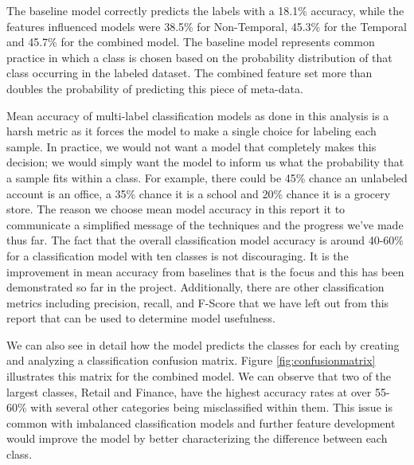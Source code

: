 The baseline model correctly predicts the labels with a 18.1\% accuracy, while the features influenced models were 38.5\% for Non-Temporal, 45.3\% for the Temporal and 45.7\% for the combined model.  The baseline model represents common practice in which a class is chosen based on the probability distribution of that class occurring in the labeled dataset. The combined feature set more than doubles the probability of predicting this piece of meta-data.

Mean accuracy of multi-label classification models as done in this analysis is a harsh metric as it forces the model to make a single choice for labeling each sample. In practice, we would not want a model that completely makes this decision; we would simply want the model to inform us what the probability that a sample fits within a class. For example, there could be 45\% chance an unlabeled account is an office, a 35\% chance it is a school and 20\% chance it is a grocery store. The reason we choose mean model accuracy in this report it to communicate a simplified message of the techniques and the progress we’ve made thus far. The fact that the overall classification model accuracy is around 40-60\% for a classification model with ten classes is not discouraging. It is the improvement in mean accuracy from baselines that is the focus and this has been demonstrated so far in the project. Additionally, there are other classification metrics including precision, recall, and F-Score that we have left out from this report that can be used to determine model usefulness. 

We can also see in detail how the model predicts the classes for each by creating and analyzing a classification confusion matrix. Figure \ref{fig:confusionmatrix} illustrates this matrix for the combined model. We can observe that two of the largest classes, Retail and Finance, have the highest accuracy rates at over 55-60\% with several other categories being misclassified within them.  This issue is common with imbalanced classification models and further feature development would improve the model by better characterizing the difference between each class.
